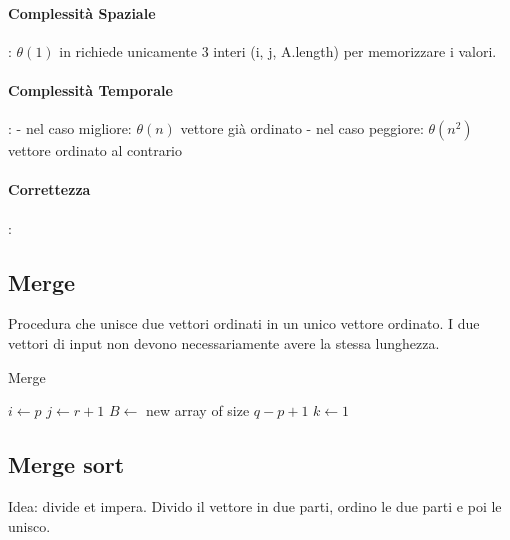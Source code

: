 \documentclass{article}
\begin{document}
\paragraph{Complessità Spaziale}: $\theta(1)$ in richiede unicamente 3 interi (i, j, A.length) 
per memorizzare i valori.

\paragraph{Complessità Temporale}: \newline
- nel caso migliore: $\theta(n)$ vettore già ordinato \newline
- nel caso peggiore: $\theta(n^2)$ vettore ordinato al contrario 

\paragraph{Correttezza}:

\newpage

\subsection{Merge} %
Procedura che unisce due vettori ordinati in un unico vettore ordinato. I due vettori di input non devono necessariamente avere la stessa lunghezza. 

\begin{algorithm}[H]
\caption{Merge}
$i \leftarrow p$\;
$j \leftarrow r + 1$\;
$B \leftarrow$ new array of size $q - p + 1$\;
$k \leftarrow 1$\;
\end{algorithm}

\subsection{Merge sort} %
Idea: divide et impera. Divido il vettore in due parti, ordino le due parti e poi le unisco.
\end{document}
